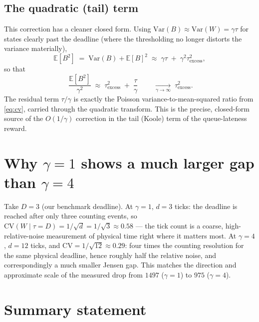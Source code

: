 \documentclass[11pt,a4paper]{article}
\newcommand{\E}{\mathbb{E}}
\newcommand{\Var}{\mathrm{Var}}
\begin{document}
\subsection{The quadratic (tail) term}

This correction has a cleaner closed form.  Using
$\Var(B) \approx \Var(W) = \gamma\tau$ for states clearly past the deadline
(where the thresholding no longer distorts the variance materially),
\begin{equation}
  \E[B^2] \;=\; \Var(B) + \E[B]^2
  \;\approx\; \gamma\tau \;+\; \gamma^2\tau_{\text{excess}}^2,
\end{equation}
so that
\begin{equation}
  \boxed{\;\frac{\E[B^2]}{\gamma^2}
  \;\approx\; \tau_{\text{excess}}^2 \;+\; \frac{\tau}{\gamma}\;}
  \qquad\xrightarrow[\gamma\to\infty]{}\;\tau_{\text{excess}}^2.
  \label{eq:quad}
\end{equation}
The residual term $\tau/\gamma$ is exactly the Poisson
variance-to-mean-squared ratio from \eqref{eq:cv}, carried through the
quadratic transform.  This is the precise, closed-form source of the
$O(1/\gamma)$ correction in the tail (Koole) term of the queue-lateness
reward.

\section{Why $\gamma = 1$ shows a much larger gap than $\gamma = 4$}

Take $D = 3$ (our benchmark deadline).  At $\gamma = 1$, $d = 3$ ticks: the
deadline is reached after only three counting events, so
$\mathrm{CV}(W \mid \tau{=}D) = 1/\sqrt{d} = 1/\sqrt{3} \approx 0.58$ --- the
tick count is a coarse, high-relative-noise measurement of physical time right
where it matters most.  At $\gamma = 4$, $d = 12$ ticks, and
$\mathrm{CV} = 1/\sqrt{12} \approx 0.29$: four times the counting resolution
for the same physical deadline, hence roughly half the relative noise, and
correspondingly a much smaller Jensen gap.  This matches the direction and
approximate scale of the measured drop from $1497$ ($\gamma=1$) to $975$
($\gamma=4$).

\section{Summary statement}
\end{document}
